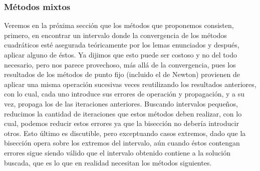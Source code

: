 \subsubsection{Métodos mixtos}
Veremos en la próxima sección que los métodos que proponemos consisten, primero, en encontrar un intervalo donde la convergencia de los métodos cuadráticos esté asegurada teóricamente por los lemas enunciados y después, aplicar alguno de éstos. Ya dijimos que esto puede ser costoso y no del todo necesario, pero nos parece provechoso, más allá de la convergencia, pues los resultados de los métodos de punto fijo (incluido el de Newton) provienen de aplicar una misma operación sucesivas veces reutilizando los resultados anteriores, con lo cual, cada uno introduce sus errores de operación y propagación, y a su vez, propaga los de las iteraciones anteriores. Buscando intervalos pequeños, reducimos la cantidad de iteraciones que estos métodos deben realizar, con lo cual, podemos reducir estos errores ya que la bisección no debería introducir otros. Esto último es discutible, pero exceptuando casos extremos, dado que la bisección opera sobre los extremos del intervalo, aún cuando éstos contengan errores sigue siendo válido que el intervalo obtenido contiene a la solución buscada, que es lo que en realidad necesitan los métodos siguientes.



